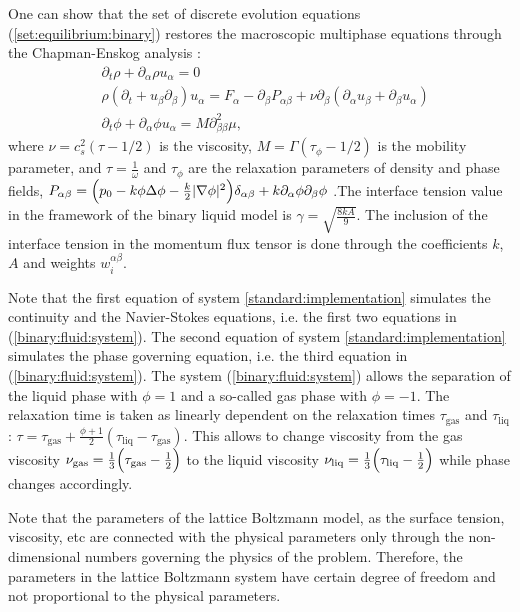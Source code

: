 \documentclass{article}
\begin{document}
One can show that the set of discrete evolution equations (\ref{set:equilibrium:binary}) restores the
macroscopic
multiphase equations through the Chapman-Enskog analysis \cite{chapman}:
\begin{equation}
\begin{aligned}
&\partial_t \rho+ \partial_{\alpha} \rho u_{\alpha}=0\\
&\rho\left(\partial_t+u_{\beta}\partial_{\beta}\right) u_{\alpha}= F_{\alpha}
-\partial_{\beta}P_{\alpha \beta} +
\nu\partial_{\beta}\left(\partial_{\alpha}u_{\beta}+\partial_{\beta} u_{\alpha}\right)\\
&\partial_t \phi + \partial_{\alpha} \phi u_{\alpha}=M \partial^2_{\beta\beta} \mu,
\end{aligned}
\label{binary:fluid:system}
\end{equation}
where $\nu=c_s^2 (\tau-1/2)$ is the viscosity,
$M=\Gamma(\tau_{\phi}-1/2)$ is the mobility parameter, and $\tau=\frac{1}{\omega}$ and $\tau_{\phi}$
are the relaxation parameters of density and phase fields, 
$P_{\alpha\beta}=\Bigl(p_0-k\phi \Delta \phi -\frac{k}{2}|\nabla \phi|^2\Bigr)\delta_{\alpha\beta}
+ k \partial_{\alpha} \phi \partial_{\beta} \phi$  \cite{pooley-contact}.The interface tension value
in the framework of the binary liquid model is $\gamma=\sqrt{\frac{8 k
A}{9}}$. The inclusion of the interface tension in the momentum flux tensor is done through the
coefficients $k$, $A$ and weights $w_i^{\alpha\beta}$.

Note that the first equation of system \ref{standard:implementation} simulates the continuity and
the Navier-Stokes equations, i.e. the first two equations in (\ref{binary:fluid:system}). The second
equation
of system \ref{standard:implementation} simulates the phase governing equation, i.e. the third
equation in
(\ref{binary:fluid:system}). The system (\ref{binary:fluid:system}) allows the separation of the
liquid
phase with $\phi=1$ and a so-called gas phase with $\phi=-1$. The
relaxation time is taken as linearly dependent on the relaxation
times $\tau_{\mathrm{gas}}$ and $\tau_{\mathrm{liq}}$:
$\tau=\tau_{\mathrm{gas}}+\frac{\phi+1}{2}(\tau_{\mathrm{liq}}-\tau_{\mathrm{gas}})$. This allows
to change viscosity from the gas viscosity
$\nu_{\mathrm{gas}}=\frac{1}{3}\Bigl(\tau_{\mathrm{gas}}-\frac{1}{2}\Bigr)$ to the liquid viscosity
$\nu_{\mathrm{liq}}=\frac{1}{3}\Bigl(\tau_{\mathrm{liq}}-\frac{1}{2}\Bigr)$ while phase changes
accordingly.

Note that the parameters of the lattice
Boltzmann model, as the surface tension, viscosity, etc are connected with the physical parameters only through the non-dimensional
numbers governing the physics of the problem.  Therefore, the parameters in the lattice Boltzmann system have certain degree of freedom and not proportional to the physical parameters.
\end{document}
